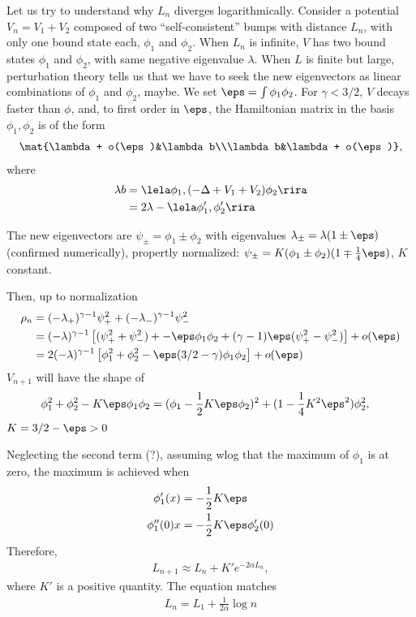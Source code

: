 \documentclass[10pt,a4paper,reqno]{amsart}
\begin{document}
Let us try to understand why $L_{n}$ diverges
logarithmically. Consider a potential $V_{n} = V_{1} + V_{2}$ composed
of two ``self-consistent'' bumps with distance $L_{n}$, with only one
bound state each, $\phi_{1}$ and $\phi_{2}$. When $L_{n}$ is infinite,
$V$ has two bound states $\phi_{1}$ and $\phi_{2}$, with same negative
eigenvalue $\lambda$. When $L$ is finite but large, perturbation
theory tells us that we have to seek the new eigenvectors as linear
combinations of $\phi_{1}$ and $\phi_{2}$, maybe. We set $\eps = \int
\phi_{1} \phi_{2}$. For $\gamma < 3/2$, $V$ decays faster than $\phi$,
and, to first order in $\eps$, the Hamiltonian matrix in the basis
$\phi_{1}, \phi_{2}$ is of the form
\begin{align*}
  \mat{\lambda + o(\eps)&\lambda b\\\lambda b&\lambda + o(\eps)},
\end{align*}
where
\begin{align*}
  \lambda b &= \lela \phi_{1}, (-\Delta + V_{1} + V_{2})
  \phi_{2}\rira\\
  &= 2 \lambda - \lela \phi'_{1}, \phi'_{2}\rira
\end{align*}


The new eigenvectors are
$\psi_{\pm} = \phi_{1} \pm \phi_{2}$ with eigenvalues $\lambda_{\pm} =
\lambda (1\pm\eps)$ (confirmed numerically), propertly normalized:
$\psi_{\pm} = K(\phi_{1}\pm\phi_{2})(1\mp \frac 1 4 \eps)$, $K$ constant.

Then, up to normalization
\begin{align*}
  \rho_{n} &= (-\lambda_{+})^{\gamma-1} \psi_{+}^{2} +
  (-\lambda_{-})^{\gamma-1} \psi_{-}^{2}\\
  &= (-\lambda)^{\gamma-1}\left[(\psi_{+}^{2} + \psi_{-}^{2}) +
  -\eps \phi_{1} \phi_{2} + (\gamma-1)\eps (\psi_{+}^{2} -
  \psi_{-}^{2})\right] + o(\eps)\\
&= 2(-\lambda)^{\gamma-1}\left[\phi_1^{2} + \phi_2^{2} -
  \eps (3/2-\gamma) \phi_{1} \phi_{2}\right] + o(\eps)
\end{align*}
$V_{n+1}$ will have the shape of
\begin{align*}
  \phi_{1}^{2} + \phi_{2}^{2} - K \eps \phi_{1} \phi_{2}
  &= (\phi_{1} - \frac 1 2 K \eps \phi_{2})^{2} + (1 - \frac 1 4 K^{2}
  \eps^{2})\phi_{2}^{2},
\end{align*}
$K = 3/2 - \eps > 0$

Neglecting the second term (?), assuming wlog that the maximum of
$\phi_{1}$ is at zero, the maximum is achieved when
\begin{align*}
  \phi_{1}'(x) &= - \frac 1 2 K \eps \\
  \phi_{1}''(0) x &= - \frac 1 2 K  \eps \phi_{2}'(0)
\end{align*}
Therefore, 
\begin{align*}
  L_{n+1} \approx L_{n} + K' e^{-2\alpha L_{n}},
\end{align*}
where $K'$ is a positive quantity. The equation matches
\begin{align*}
  L_{n} = L_{1} +  \frac 1 {2\alpha} \log n
\end{align*}
\end{document}
